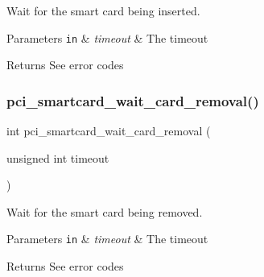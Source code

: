 Wait for the smart card being inserted.


\begin{DoxyParams}[1]{Parameters}
\mbox{\tt in}  & {\em timeout} & The timeout\\
\hline
\end{DoxyParams}
\begin{DoxyReturn}{Returns}
See error codes
\end{DoxyReturn}
\hypertarget{group__pcibx__sc_gab0d9d214315edba6757eb7a56508e7fb}{}\label{group__pcibx__sc_gab0d9d214315edba6757eb7a56508e7fb}
\subsubsection{\texorpdfstring{pci\+\_\+smartcard\+\_\+wait\+\_\+card\+\_\+removal()}{pci\_smartcard\_wait\_card\_removal()}}
{\footnotesize\ttfamily int pci\+\_\+smartcard\+\_\+wait\+\_\+card\+\_\+removal (\begin{DoxyParamCaption}\item[{unsigned int}]{timeout }\end{DoxyParamCaption})}



Wait for the smart card being removed.


\begin{DoxyParams}[1]{Parameters}
\mbox{\tt in}  & {\em timeout} & The timeout\\
\hline
\end{DoxyParams}
\begin{DoxyReturn}{Returns}
See error codes
\end{DoxyReturn}
